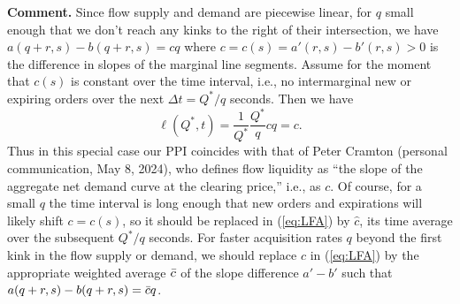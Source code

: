 \noindent
\textbf{Comment.} Since flow supply and demand are piecewise linear, for $q$ small enough that we don't reach any kinks to the right of their intersection, we have 
$a(q+r,s)-b(q+r,s) = cq$ where  $c=c(s) = a'(r,s) - b'(r,s)>0$
is the difference in slopes of the marginal line segments.
Assume for the moment that $c(s)$ is constant over the time interval, i.e., no intermarginal new or expiring orders over the next $\Delta t =Q^*/q$ seconds.
Then we have
\begin{equation}\label{eq:LFA}
\ell (Q^*,t)=  \frac{1}{Q^*}\frac{Q^*}{q}cq = c.  
\end{equation}
Thus in this special case our PPI coincides with that of Peter Cramton (personal communication, May 8, 2024), who 
defines flow liquidity as ``the slope of the aggregate net demand curve at the clearing price,'' i.e., as $c.$
Of course, for a small $q$ the time interval is long enough that new orders and expirations will likely shift $c=c(s)$, so it should be replaced in (\ref{eq:LFA}) by $\hat{c}$, its time average  over the subsequent 
$Q^*/q$ seconds.
For faster acquisition rates $q$ 
beyond the first kink in the flow supply or demand, 
we should replace $\hat{c}$ in 
(\ref{eq:LFA}) by the appropriate weighted average $\Bar{c}$ of the slope difference $a' - b'$
such that $a(q+r,s) - b(q+r,s) = \Bar{c} q $.





